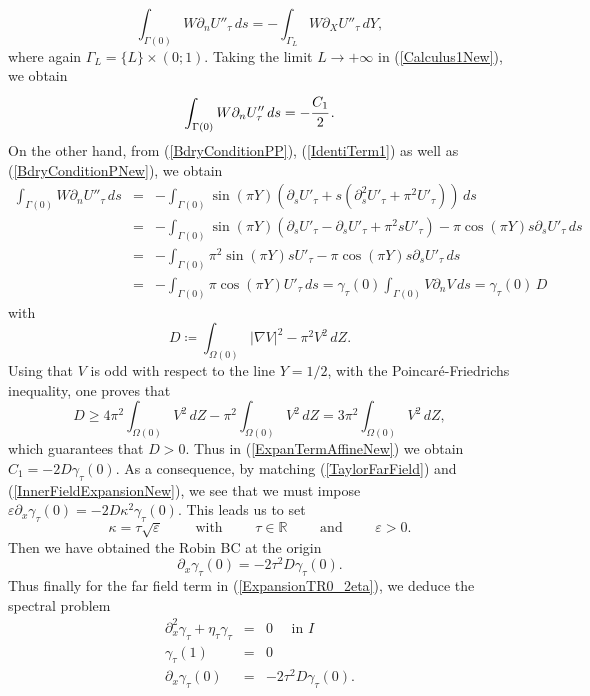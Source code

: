 \documentclass[11pt,a4paper]{article}
\newcommand{\dsp}{\displaystyle}
\newcommand{\eps}{\varepsilon}
\newcommand{\Om}{\Omega}
\newcommand{\R}{\mathbb{R}}
\begin{document}
\begin{equation}\label{Calculus1New}
\int_{\Gamma(0)} W\partial_n U''_{\tau}\,ds=-\int_{\Gamma_L} W\partial_X U''_{\tau}\,dY,
\end{equation}
where again $\Gamma_L=\{L\}\times(0;1)$. Taking the limit $L\to+\infty$ in (\ref{Calculus1New}), we obtain 
\[
\int_{\Gamma(0)} W\partial_n U''_{\tau}\,ds=-\cfrac{C_1}{2}\,.
\]
On the other hand, from (\ref{BdryConditionPP}), (\ref{IdentiTerm1}) as well as (\ref{BdryConditionPNew}), we obtain
\[
\begin{array}{rcl}
\dsp\int_{\Gamma(0)} W\partial_n U''_{\tau}\,ds&=&-\dsp\int_{\Gamma(0)} \sin(\pi Y)(\partial_sU'_{\tau}+ s(\partial^2_sU'_{\tau}+\pi^2U'_{\tau}))\,ds \\[8pt]
&=&-\dsp\int_{\Gamma(0)} \sin(\pi Y)(\partial_sU'_{\tau}-\partial_sU'_{\tau}+\pi^2sU'_{\tau})-\pi\cos(\pi Y)s\partial_sU'_{\tau}\,ds \\[8pt]
&=&-\dsp\int_{\Gamma(0)} \pi^2\sin(\pi Y)sU'_{\tau}-\pi\cos(\pi Y)s\partial_sU'_{\tau}\,ds \\[8pt]
&=&-\dsp\int_{\Gamma(0)} \pi\cos(\pi Y)U'_{\tau}\,ds=\gamma_\tau(0)\int_{\Gamma(0)} V\partial_nV\,ds =\gamma_\tau(0)\,D
\end{array}
\]
with 
\begin{equation}\label{CalculusD}
D\coloneqq\int_{\Om(0)}|\nabla V|^2-\pi^2V^2\,dZ.
\end{equation}
Using that $V$ is odd with respect to the line $Y=1/2$, with the Poincar\'e-Friedrichs inequality, one proves that
\[
D\ge 4\pi^2\int_{\Om(0)}V^2\,dZ-\pi^2\int_{\Om(0)}V^2\,dZ=3\pi^2\int_{\Om(0)}V^2\,dZ,
\]
which guarantees that $D>0$. Thus in (\ref{ExpanTermAffineNew}) we obtain $C_1=-2D\gamma_\tau(0)$. As a consequence, by matching (\ref{TaylorFarField}) and (\ref{InnerFieldExpansionNew}), we see that we must impose $\eps\partial_x\gamma_\tau(0)=-2D\kappa^2\gamma_\tau(0)$. This leads us to set 
\[
\kappa=\tau\sqrt{\eps}\qquad\mbox{ with }\qquad\tau\in\R\qquad\mbox{ and }\qquad\eps>0. 
\]
Then we have obtained the Robin BC at the origin
\[
\partial_x\gamma_\tau(0)=-2\tau^2D\gamma_\tau(0).
\]
Thus finally for the far field term in (\ref{ExpansionTR0_2eta}), we deduce the spectral problem 
\begin{equation}\label{PbRobin2}
\begin{array}{|rcl}
\partial^2_x\gamma_\tau+\eta_\tau\gamma_\tau&=&0\quad\mbox{ in }I\\[3pt]
\gamma_\tau(1)&=&0\\[3pt]
\partial_x\gamma_\tau(0)&=&-2\tau^2D\gamma_\tau(0).
\end{array}
\end{equation}
\end{document}
